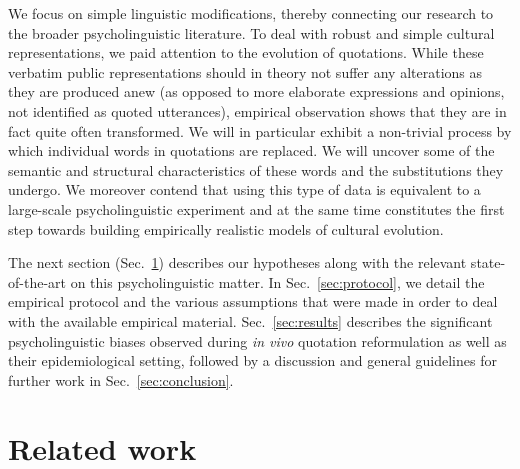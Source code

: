 We focus on simple linguistic modifications, thereby connecting our research to the broader psycholinguistic literature.
To deal with robust and simple cultural representations, we paid attention to the evolution of quotations.
While these verbatim public representations should in theory not suffer any alterations as they are produced anew (as opposed to more elaborate expressions and opinions, not identified as quoted utterances), empirical observation shows that they are in fact quite often transformed.
We will in particular exhibit a non-trivial process by which individual words in quotations are replaced.
We will uncover some of the semantic and structural characteristics of these words and the substitutions they undergo.
We moreover contend that using this type of data is equivalent to a large-scale psycholinguistic experiment and at the same time constitutes the first step towards building empirically realistic models of cultural evolution.

The next section (Sec.~\ref{sec:related}) describes our hypotheses along with the relevant state-of-the-art on this psycholinguistic matter.
In Sec.~\ref{sec:protocol}, we detail the empirical protocol and the various assumptions that were made in order to deal with the available empirical material.
Sec.~\ref{sec:results} describes the significant psycholinguistic biases observed during \emph{in vivo} quotation reformulation as well as their epidemiological setting, followed by a discussion and general guidelines for further work in Sec.~\ref{sec:conclusion}.

\section{Related work} %
\label{sec:related}

 
